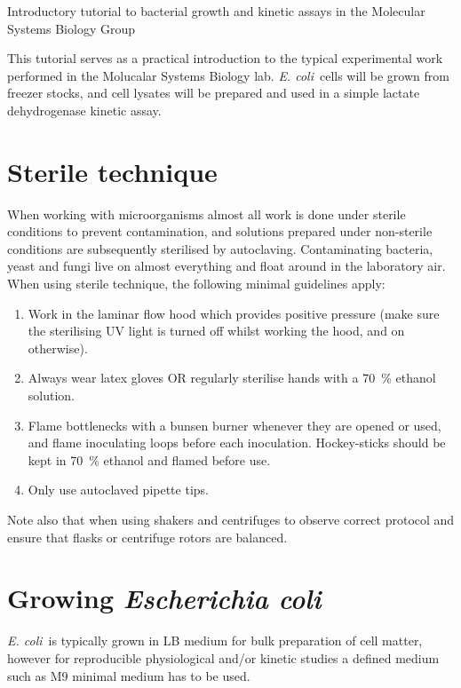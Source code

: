 \documentclass[a4paper]{article}
\newcommand{\ec}{\textit{E. coli}}
\begin{document}
 \begin{center} \huge Introductory tutorial to bacterial growth
and kinetic assays in the Molecular Systems Biology Group\\ \normalsize
\end{center} 

\begin{multicols}{2} This tutorial serves as a practical introduction to the
typical experimental work performed in the Molucalar Systems Biology lab. \ec\
cells will be grown from freezer stocks, and cell lysates will be prepared and
used in a simple lactate dehydrogenase kinetic assay.

\section{Sterile technique} 

When working with microorganisms almost all work is done under sterile
conditions to prevent contamination, and solutions prepared under non-sterile
conditions are subsequently sterilised by autoclaving. Contaminating bacteria,
yeast and fungi live on almost everything and float around in the laboratory
air. When using sterile technique, the following minimal guidelines apply:

\begin{enumerate} 
\item Work in the laminar flow hood which provides positive
pressure (make sure the sterilising UV light is turned off whilst working the
hood, and on otherwise).  
\item Always wear latex gloves OR regularly sterilise
hands with a 70~\% ethanol solution.  
\item Flame bottlenecks with a bunsen
burner whenever they are opened or used, and flame inoculating loops before
each inoculation. Hockey-sticks should be kept in 70~\% ethanol and flamed
before use.  
\item Only use autoclaved pipette tips.  
\end{enumerate}

Note also that when using shakers and centrifuges to observe correct protocol
and ensure that flasks or centrifuge rotors are balanced.

\section{Growing \textit{Escherichia coli}} 

\ec\ is typically grown in LB medium for bulk preparation of cell matter,
however for reproducible physiological and/or kinetic studies a defined medium
such as M9 minimal medium has to be used.


\end{multicols}
\end{document}
